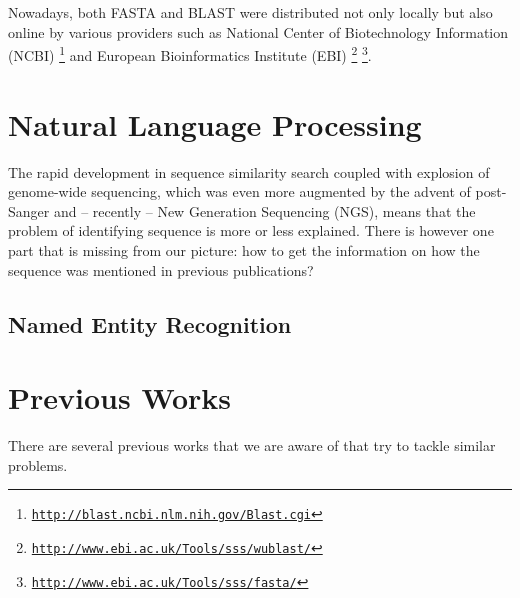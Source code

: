 Nowadays, both FASTA and BLAST were distributed not only locally but also online by various providers such as National Center of Biotechnology Information (NCBI) \footnote{\href{http://blast.ncbi.nlm.nih.gov/Blast.cgi}{\texttt{http://blast.ncbi.nlm.nih.gov/Blast.cgi}}} and European Bioinformatics Institute (EBI) \footnote{\href{http://www.ebi.ac.uk/Tools/sss/wublast/}{\texttt{http://www.ebi.ac.uk/Tools/sss/wublast/}}} \footnote{\href{http://www.ebi.ac.uk/Tools/sss/fasta/}{\texttt{http://www.ebi.ac.uk/Tools/sss/fasta/}}}.


\section{Natural Language Processing}

The rapid development in sequence similarity search coupled with explosion of genome-wide sequencing, which was even more augmented by the advent of post-Sanger and -- recently -- New Generation Sequencing (NGS), means that the problem of identifying sequence is more or less explained. There is however one part that is missing from our picture: how to get the information on how the sequence was mentioned in previous publications?

\subsection{Named Entity Recognition}


\section{Previous Works}

There are several previous works that we are aware of that try to tackle similar problems. 